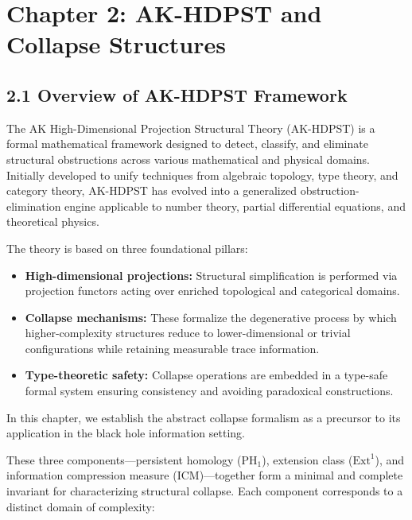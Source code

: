 \documentclass[11pt]{article}
\begin{document}
\section{Chapter 2: AK-HDPST and Collapse Structures}

\subsection*{2.1 Overview of AK-HDPST Framework}

The AK High-Dimensional Projection Structural Theory (AK-HDPST) is a formal mathematical framework designed to detect, classify, and eliminate structural obstructions across various mathematical and physical domains. Initially developed to unify techniques from algebraic topology, type theory, and category theory, AK-HDPST has evolved into a generalized obstruction-elimination engine applicable to number theory, partial differential equations, and theoretical physics.

The theory is based on three foundational pillars:

\begin{itemize}
    \item \textbf{High-dimensional projections:} Structural simplification is performed via projection functors acting over enriched topological and categorical domains.
    \item \textbf{Collapse mechanisms:} These formalize the degenerative process by which higher-complexity structures reduce to lower-dimensional or trivial configurations while retaining measurable trace information.
    \item \textbf{Type-theoretic safety:} Collapse operations are embedded in a type-safe formal system ensuring consistency and avoiding paradoxical constructions.
\end{itemize}

In this chapter, we establish the abstract collapse formalism as a precursor to its application in the black hole information setting.

These three components—persistent homology (\( \mathrm{PH}_1 \)), extension class (\( \mathrm{Ext}^1 \)), and information compression measure (\( \mathrm{ICM} \))—together form a minimal and complete invariant for characterizing structural collapse. Each component corresponds to a distinct domain of complexity:
\end{document}
